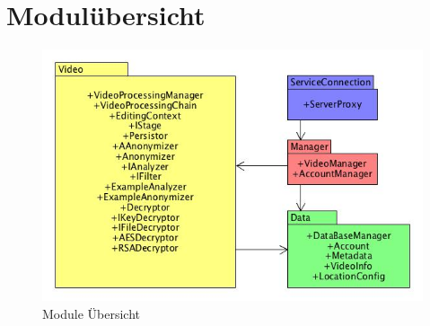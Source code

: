 \section{Modulübersicht} \label{service:modul}

\begin{figure}[ht]
	\centering
\includegraphics[width=1\textwidth]{./resources/Diagramme/Webservice/modules_overview.jpg}
\caption{Module Übersicht}
	\label{fig:modules_overview}
\end{figure}




